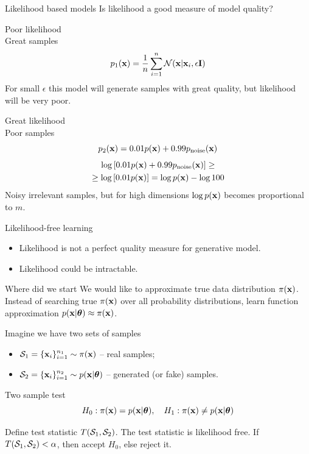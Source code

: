 \begin{frame}{Likelihood based models}
	Is likelihood a good measure of model quality?
	\begin{minipage}[t]{0.48\columnwidth}
		\begin{block}{Poor likelihood \\ Great samples}
			\vspace{-0.3cm}
			\[
				p_1(\mathbf{x}) = \frac{1}{n} \sum_{i=1}^n \mathcal{N}(\mathbf{x} | \mathbf{x}_i, \epsilon \mathbf{I})
			\]
			For small $\epsilon$ this model will generate samples with great quality, but likelihood will be very poor.
		\end{block}
	\end{minipage}%
	\begin{minipage}[t]{0.52\columnwidth}
		\begin{block}{Great likelihood \\ Poor samples}
			\vspace{-0.3cm}
			\[
				p_2(\mathbf{x}) = 0.01p(\mathbf{x}) + 0.99p_{\text{noise}}(\mathbf{x})
			\]
			\begin{multline*}
				\log \left[ 0.01p(\mathbf{x}) + 0.99p_{\text{noise}}(\mathbf{x}) \right] \geq  \\ \geq \log \left[ 0.01p(\mathbf{x}) \right]  = \log p(\mathbf{x}) - \log 100
			\end{multline*}
		Noisy irrelevant samples, but for high dimensions $\log p(\mathbf{x})$ becomes proportional to $m$.
		\end{block}
	\end{minipage}
\end{frame}
\begin{frame}{Likelihood-free learning}
	\begin{itemize}
		\item Likelihood is not a perfect quality measure for generative model.
		\item Likelihood could be intractable.
	\end{itemize}
	\begin{block}{Where did we start}
	 We would like to approximate true data distribution $\pi(\mathbf{x})$.
		Instead of searching true $\pi(\mathbf{x})$ over all probability distributions, learn function approximation $p(\mathbf{x} | \boldsymbol{\theta}) \approx \pi(\mathbf{x})$.
	\end{block}
	Imagine we have two sets of samples 
	\begin{itemize}
		\item $\mathcal{S}_1 = \{\mathbf{x}_i\}_{i=1}^{n_1} \sim \pi(\mathbf{x})$ -- real samples;
		\item $\mathcal{S}_2 = \{\mathbf{x}_i\}_{i=1}^{n_2} \sim p(\mathbf{x} | \boldsymbol{\theta})$ -- generated (or fake) samples.
	\end{itemize}
	\begin{block}{Two sample test}
		\vspace{-0.3cm}
		\[
			H_0: \pi(\mathbf{x}) = p(\mathbf{x} | \boldsymbol{\theta}), \quad H_1: \pi(\mathbf{x}) \neq p(\mathbf{x} | \boldsymbol{\theta})
		\]
	\end{block}
	Define test statistic $T(\mathcal{S}_1, \mathcal{S}_2)$. The test statistic is likelihood free.
	If $T(\mathcal{S}_1, \mathcal{S}_2) < \alpha$, then accept $H_0$, else reject it.
\end{frame}
